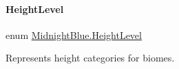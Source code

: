 \hypertarget{namespace_midnight_blue_a86f8aaa0bbb651a6a094d3eb95f799e0}{}\label{namespace_midnight_blue_a86f8aaa0bbb651a6a094d3eb95f799e0} 
\paragraph{\texorpdfstring{Height\+Level}{HeightLevel}}
{\footnotesize\ttfamily enum \hyperlink{namespace_midnight_blue_a86f8aaa0bbb651a6a094d3eb95f799e0}{Midnight\+Blue.\+Height\+Level}\hspace{0.3cm}{\ttfamily [strong]}}



Represents height categories for biomes. 


